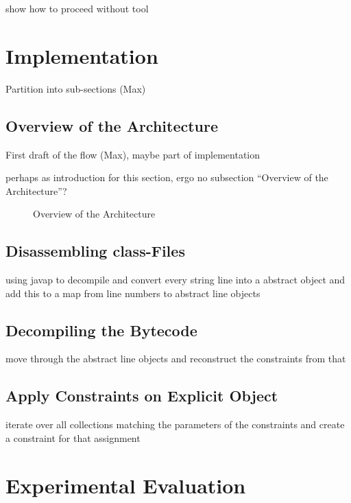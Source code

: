 \documentclass[conference]{IEEEtran}
\begin{document}
\danger show how to proceed without tool

\section{Implementation}
\label{sec:implementation}

\danger Partition into sub-sections (Max)

\subsection{Overview of the Architecture}
\label{sec:impl_overv-arch}

\danger First draft of the flow (Max), maybe part of implementation

\danger perhaps as introduction for this section, ergo no subsection ``Overview
of the Architecture''?

\begin{figure*}[!ht]
  \centering
  \label{fig:architecture}
  \tikzarchitecture
  \caption{Overview of the Architecture}
\end{figure*}

\subsection{Disassembling class-Files}
\label{sec:impl_disassembling}

\danger using javap to decompile and convert every string line into a abstract
object and add this to a map from line numbers to abstract line objects

\subsection{Decompiling the Bytecode}
\label{sec:impl_decompiling}

\danger move through the abstract line objects and reconstruct the constraints
from that

\subsection{Apply Constraints on Explicit Object}
\label{sec:impl_applying}

\danger iterate over all collections matching the parameters of the constraints
and create a constraint for that assignment

\section{Experimental Evaluation}
\label{sec:exper-eval}
\end{document}
